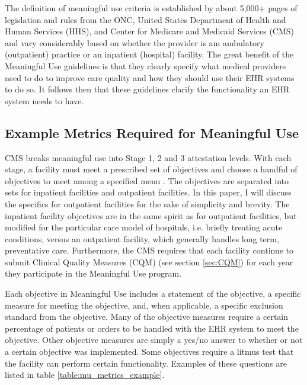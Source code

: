 \documentclass[10pt]{article}
\begin{document}
The definition of meaningful use criteria is established by about 5,000+ pages of legislation and rules from the ONC, United States Department of Health and Human Services (HHS), and Center for Medicare and Medicaid Services (CMS) and vary considerably based on whether the provider is am ambulatory (outpatient) practice or an inpatient (hospital) facility.
The great benefit of the Meaningful Use guidelines is that they clearly specify what medical providers need to do to improve care quality and how they should use their EHR systems to do so.
It follows then that these guidelines clarify the functionality an EHR system needs to have.

\subsection{Example Metrics Required for Meaningful Use}
\label{sec:Meaningful Use Metrics}

CMS breaks meaningful use into Stage 1, 2 and 3 attestation levels.
With each stage, a facility must meet a prescribed set of objectives and choose a handful of objectives to meet among a specified menu \cite{cms-stage1}.
The objectives are separated into sets for inpatient facilities and outpatient facilities.
In this paper, I will discuss the specifics for outpatient facilities for the sake of simplicity and brevity.
The inpatient facility objectives are in the same spirit as for outpatient facilities, but modified for the particular care model of hospitals, i.e. briefly treating acute conditions, versus an outpatient facility, which generally handles long term, preventative care.
Furthermore, the CMS requires that each facility continue to submit Clinical Quality Measures (CQM) (see section \ref{sec:CQM}) for each year they participate in the Meaningful Use program.

Each objective in Meaningful Use includes a statement of the objective, a specific measure for meeting the objective, and, when applicable, a specific exclusion standard from the objective.
Many of the objective measures require a certain percentage of patients or orders to be handled with the EHR system to meet the objective.
Other objective measures are simply a yes/no answer to whether or not a certain objective was implemented.
Some objectives require a litmus test that the facility can perform certain functionality. Examples of these questions are listed in table \ref{table:mu_metrics_example}.
\end{document}

